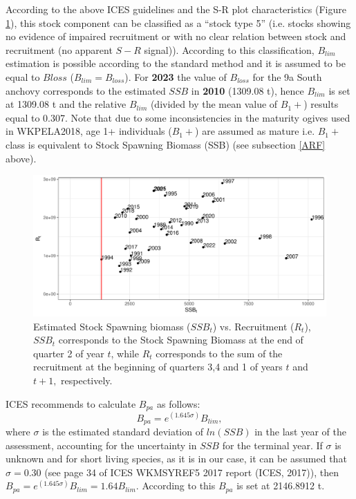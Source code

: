 \documentclass[review]{elsarticle}
\begin{document}
According to the above ICES guidelines and the S-R plot characteristics (Figure \ref{SSBt_1rect}), this stock component can be classified as a “stock type 5” (i.e. stocks showing no evidence of impaired recruitment or with no clear relation between stock and recruitment (no apparent $S-R$ signal)). According to this classification, $B_{lim}$ estimation is possible according to the standard method and it is assumed to be equal to $Bloss$ ($B_{lim}=B_{loss}$). For \textbf{2023} the value of $B_{loss}$ for the 9a South anchovy corresponds to the estimated $SSB$ in \textbf{2010} (1309.08 t),  hence $B_{lim}$ is set at 1309.08 t and the relative $B_{lim}$ (divided by the mean value of $B_1+$) results equal to 0.307. Note that due to some inconsistencies in the maturity ogives used in WKPELA2018, age 1+ individuals ($B_1+$) are assumed as mature i.e. $B_1+$ class is equivalent to Stock Spawning Biomass (SSB) (see subsection \ref{ARF} above).
\begin{figure}[h!]
 \centering
 \includegraphics[bb=0 0 595 288]{./SSBt_1rect.pdf}
 \caption{Estimated Stock Spawning biomass ($SSB_{t}$) vs. Recruitment ($R_{t}$), $SSB_{t}$ corresponds to the Stock Spawning Biomass at the end of quarter 2 of year $t$, while $R_{t}$ corresponds to the sum of the recruitment at the beginning of quarters 3,4 and 1 of years $t$ and $t+1,$ respectively.}
 \label{SSBt_1rect}
\end{figure}

ICES recommends to calculate $B_{pa}$ as follows: $$B_{pa} = e^{(1.645\sigma)} B_{lim},$$
where  $\sigma$  is the estimated standard deviation of $ln(SSB)$ in the last year of the assessment, accounting for the uncertainty in $SSB$ for the terminal year.  If $\sigma$ is unknown and for short living species, as it is in our case, it can be assumed that $\sigma = 0.30$ (see page 34 of ICES WKMSYREF5 2017 report (ICES, 2017)), then $B_{pa} = e^{(1.645\sigma)}B_{lim}=1.64B_{lim}$. According to this $B_{pa}$ is set at 2146.8912 t.
\end{document}
